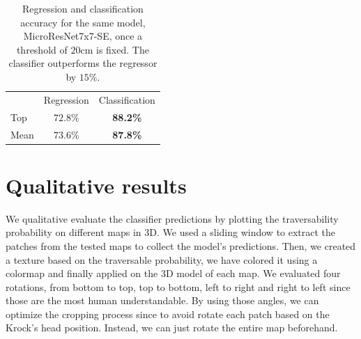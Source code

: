 \documentclass[../document.tex]{subfiles}
\begin{document}
\begin{table}[htbp]
  \centering
  \begin{tabular}{@{}lcc@{}}
  \toprule
  &  Regression & Classification  \\
  \cline{1-3}
   Top & $72.8\%$ & \textbf{88.2\%} \\
   Mean & $73.6\%$ & \textbf{87.8\%} \\
  \bottomrule   
\end{tabular}
\caption{Regression and classification accuracy for the same model,  MicroResNet7x7-SE, once a threshold of $20$cm is fixed. The classifier outperforms the regressor by $15\%$.}
\label{tab : reg-clas}
\end{table}
\section{Qualitative results}
We qualitative evaluate the classifier predictions by plotting the traversability probability on different maps in 3D.  We used a sliding window to extract the patches from the tested maps to collect the model's predictions. Then, we created a texture based on the traversable probability, we have colored it using a colormap and finally applied on the 3D model of each map. We evaluated four rotations, from bottom to top, top to bottom, left to right and right to left since those are the most human understandable. By using those angles, we can optimize the cropping process since to avoid rotate each patch based on the Krock's head position. Instead, we can just rotate the entire map beforehand. 
\end{document}
